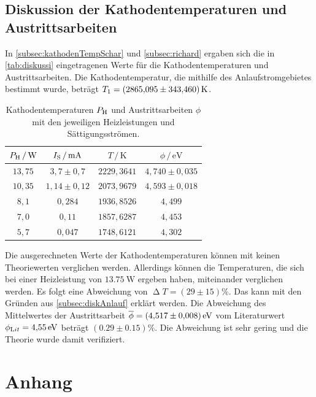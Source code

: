 \subsection{Diskussion der Kathodentemperaturen und Austrittsarbeiten}
\label{subsec:diskTemps}

In \autoref{subsec:kathodenTempSchar} und \autoref{subsec:richard} ergaben sich die in \autoref{tab:diskussi} eingetragenen Werte für die Kathodentemperaturen und Austrittsarbeiten.
Die Kathodentemperatur, die mithilfe des Anlaufstromgebietes bestimmt wurde, beträgt $T_1 = \SI{2865,095 \pm 343,460}{\kelvin}$.
\begin{table}[H]
    \caption{Kathodentemperaturen $P_{\text H}$ und Austrittsarbeiten $\phi$ mit den jeweiligen Heizleistungen und Sättigungsströmen.}
    \label{tab:diskussi}
    \centering
    \begin{tabular}{c c c c}
        \toprule
        $P_{\text H} \,/\, \si{\watt}$ & $I_{\text S} \,/\, \si{\milli\ampere}$ & $T \,/\, \si{\kelvin}$ & $\phi \,/\, \si{\eV}$\\
        \midrule
        $13,75$ & $3,7 \pm 0,7$   & $2229,3641$ & $4,740 \pm 0,035$ \\
        $10,35$ & $1,14 \pm 0,12$ & $2073,9679$ & $4,593 \pm 0,018$ \\
        $8,1$   & $0,284$         & $1936,8526$ & $4,499$ \\
        $7,0$   & $0,11$          & $1857,6287$ & $4,453$ \\
        $5,7$   & $0,047$         & $1748,6121$ & $4,302$ \\
        \bottomrule
      \end{tabular}
  \end{table}

  \noindent
Die ausgerechneten Werte der Kathodentemperaturen können mit keinen Theoriewerten verglichen werden. Allerdings können die Temperaturen, die sich
bei einer Heizleistung von $\SI{13,75}{\watt}$ ergeben haben, miteinander verglichen werden.
Es folgt eine Abweichung von $\upDelta T = (29 \pm 15)\%$. Das kann mit den Gründen aus \autoref{subsec:diskAnlauf} erklärt werden.
Die Abweichung des Mittelwertes der Austrittsarbeit $\overline\phi = \SI{4,517 \pm 0,008}{\eV}$ vom Literaturwert $\phi_{\text Lit} = \SI{4,55}{\eV}$
beträgt $(0.29 \pm 0.15)\%$.
Die Abweichung ist sehr gering und die Theorie wurde damit verifiziert.

\printbibliography{}

\section*{Anhang}
\label{sec:anhang}

